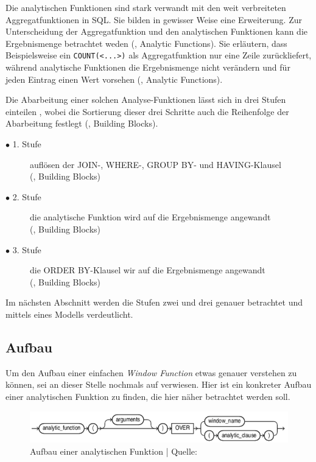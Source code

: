 Die analytischen Funktionen sind stark verwandt mit den weit verbreiteten
Aggregatfunktionen in SQL. Sie bilden in gewisser Weise eine Erweiterung. Zur
Unterscheidung der Aggregatfunktion und den analytischen Funktionen kann die
Ergebnismenge betrachtet weden (\cite{Nuijten2023}, Analytic Functions). Sie
erläutern, dass Beispielsweise ein \texttt{COUNT(<...>)} als Aggregatfunktion
nur eine Zeile zurückliefert, während analytische Funktionen die Ergebnismenge nicht
verändern und für jeden Eintrag einen Wert vorsehen (\cite{Nuijten2023}, Analytic
Functions).

Die Abarbeitung einer solchen Analyse-Funktionen lässt sich in drei Stufen
einteilen , wobei die Sortierung dieser drei Schritte auch die Reihenfolge der
Abarbeitung festlegt (\cite{Nuijten2023}, Building Blocks).
\begin{description}
	\item[$\bullet$ 1. Stufe] auflösen der JOIN-, WHERE-, GROUP BY- und HAVING-Klausel
		\\ (\cite{Nuijten2023}, Building Blocks)

	\item[$\bullet$ 2. Stufe] die analytische Funktion wird auf die Ergebnismenge angewandt
		\\ (\cite{Nuijten2023}, Building Blocks)

	\item[$\bullet$ 3. Stufe] die ORDER BY-Klausel wir auf die Ergebnismenge angewandt
		\\ (\cite{Nuijten2023}, Building Blocks)
\end{description}
Im nächsten Abschnitt werden die Stufen zwei und drei genauer betrachtet und
mittels eines Modells verdeutlicht.

\subsection{Aufbau}
Um den Aufbau einer einfachen \textit{Window Function} etwas genauer verstehen zu
können, sei an dieser Stelle nochmals auf \cite{oracle} verwiesen. Hier ist ein konkreter
Aufbau einer analytischen Funktion zu finden, die hier näher betrachtet werden
soll.

\begin{figure}[h]
	\centering
	\includegraphics[scale=0.5]{img/aufbauAnalyticFunction.jpg}
	\caption{ Aufbau einer analytischen Funktion | Quelle: \cite{oracle}}
\end{figure}

